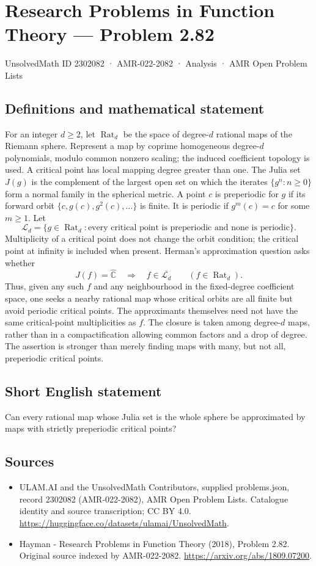 \documentclass[11pt,a4paper]{article}
\begin{document}
\section*{Research Problems in Function Theory — Problem 2.82}\label{2302082}
{\small UnsolvedMath ID 2302082 · AMR-022-2082 · Analysis · AMR Open Problem Lists}
\subsection{Definitions and mathematical statement}
For an integer $d\ge2$, let $\operatorname{Rat}_d$ be the space of degree-$d$ rational maps of the Riemann sphere. Represent a map by coprime homogeneous degree-$d$ polynomials, modulo common nonzero scaling; the induced coefficient topology is used. A critical point has local mapping degree greater than one. The Julia set $J(g)$ is the complement of the largest open set on which the iterates $\{g^n:n\ge0\}$ form a normal family in the spherical metric.
A point $c$ is preperiodic for $g$ if its forward orbit
$\{c,g(c),g^2(c),\ldots\}$ is finite. It is periodic if $g^m(c)=c$ for some $m\ge1$. Let
\[
\mathcal L_d=\{g\in\operatorname{Rat}_d:
\text{every critical point is preperiodic and none is periodic}\}.
\]
Multiplicity of a critical point does not change the orbit condition; the critical point at infinity is included when present.
Herman's approximation question asks whether
\[
J(f)=\widehat{\mathbb C}\quad\Longrightarrow\quad
f\in\overline{\mathcal L_d}
\qquad(f\in\operatorname{Rat}_d).
\]
Thus, given any such $f$ and any neighbourhood in the fixed-degree coefficient space, one seeks a nearby rational map whose critical orbits are all finite but avoid periodic critical points. The approximants themselves need not have the same critical-point multiplicities as $f$. The closure is taken among degree-$d$ maps, rather than in a compactification allowing common factors and a drop of degree. The assertion is stronger than merely finding maps with many, but not all, preperiodic critical points.
\subsection{Short English statement}
Can every rational map whose Julia set is the whole sphere be approximated by maps with strictly preperiodic critical points?
\subsection{Sources}
\begin{itemize}
\item[S1] ULAM.AI and the UnsolvedMath Contributors, supplied problems.json, record 2302082 (AMR-022-2082), AMR Open Problem Lists. Catalogue identity and source transcription; CC BY 4.0.
\url{https://huggingface.co/datasets/ulamai/UnsolvedMath}.
\item[S2] Hayman - Research Problems in Function Theory (2018), Problem 2.82. Original source indexed by AMR-022-2082.
\url{https://arxiv.org/abs/1809.07200}.
\end{itemize}
\end{document}

